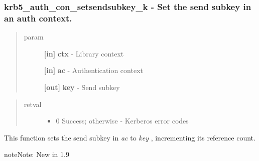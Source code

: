 \documentclass[letterpaper,10pt,english]{sphinxmanual}
\begin{document}
\subsubsection{krb5\_auth\_con\_setsendsubkey\_k -  Set the send subkey in an auth context.}
\label{appdev/refs/api/krb5_auth_con_setsendsubkey_k:krb5-auth-con-setsendsubkey-k-set-the-send-subkey-in-an-auth-context}\label{appdev/refs/api/krb5_auth_con_setsendsubkey_k::doc}

\begin{fulllineitems}
\label{appdev/refs/api/krb5_auth_con_setsendsubkey_k:c.krb5_auth_con_setsendsubkey_k}
\end{fulllineitems}

\begin{quote}\begin{description}
\item[{param}] \leavevmode
\textbf{{[}in{]}} \textbf{ctx} - Library context

\textbf{{[}in{]}} \textbf{ac} - Authentication context

\textbf{{[}out{]}} \textbf{key} - Send subkey

\end{description}\end{quote}
\begin{quote}\begin{description}
\item[{retval}] \leavevmode\begin{itemize}
\item {} 
0   Success; otherwise - Kerberos error codes

\end{itemize}

\end{description}\end{quote}

This function sets the send subkey in \emph{ac} to \emph{key} , incrementing its reference count.

\begin{notice}{note}{Note:}
New in 1.9
\end{notice}
\end{document}
